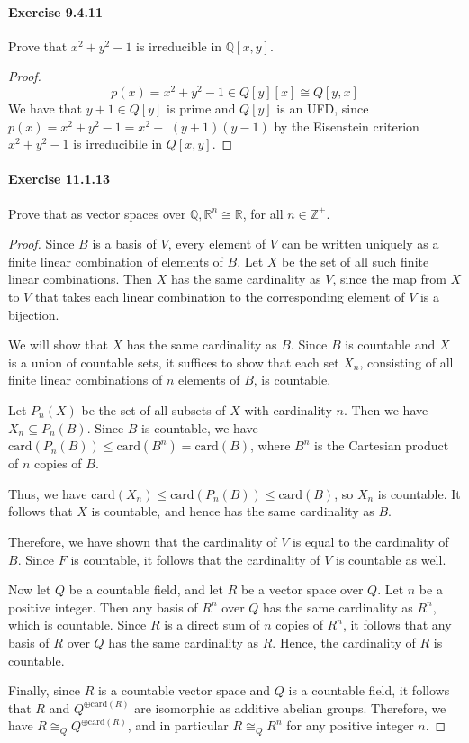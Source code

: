 \documentclass{article}
\theoremstyle{definition}
\begin{document}
\paragraph{Exercise 9.4.11} Prove that $x^2+y^2-1$ is irreducible in $\mathbb{Q}[x,y]$.
\begin{proof}
$$
p(x)=x^2+y^2-1 \in Q[y][x] \cong Q[y, x]
$$
We have that $y+1 \in Q[y]$ is prime and $Q[y]$ is an UFD, since $p(x)=x^2+y^2-1=x^2+$ $(y+1)(y-1)$ by the Eisenstein criterion $x^2+y^2-1$ is irreducibile in $Q[x, y]$.
\end{proof}



\paragraph{Exercise 11.1.13} Prove that as vector spaces over $\mathbb{Q}, \mathbb{R}^n \cong \mathbb{R}$, for all $n \in \mathbb{Z}^{+}$.
\begin{proof}    
Since $B$ is a basis of $V$, every element of $V$ can be written uniquely as a finite linear combination of elements of $B$. Let $X$ be the set of all such finite linear combinations. Then $X$ has the same cardinality as $V$, since the map from $X$ to $V$ that takes each linear combination to the corresponding element of $V$ is a bijection.

We will show that $X$ has the same cardinality as $B$. Since $B$ is countable and $X$ is a union of countable sets, it suffices to show that each set $X_n$, consisting of all finite linear combinations of $n$ elements of $B$, is countable.

Let $P_n(X)$ be the set of all subsets of $X$ with cardinality $n$. Then we have $X_n \subseteq P_n(B)$. Since $B$ is countable, we have $\mathrm{card}(P_n(B)) \leq \mathrm{card}(B^n) = \mathrm{card}(B)$, where $B^n$ is the Cartesian product of $n$ copies of $B$.

Thus, we have $\mathrm{card}(X_n) \leq \mathrm{card}(P_n(B)) \leq \mathrm{card}(B)$, so $X_n$ is countable. It follows that $X$ is countable, and hence has the same cardinality as $B$.

Therefore, we have shown that the cardinality of $V$ is equal to the cardinality of $B$. Since $F$ is countable, it follows that the cardinality of $V$ is countable as well.

Now let $Q$ be a countable field, and let $R$ be a vector space over $Q$. Let $n$ be a positive integer. Then any basis of $R^n$ over $Q$ has the same cardinality as $R^n$, which is countable. Since $R$ is a direct sum of $n$ copies of $R^n$, it follows that any basis of $R$ over $Q$ has the same cardinality as $R$. Hence, the cardinality of $R$ is countable.

Finally, since $R$ is a countable vector space and $Q$ is a countable field, it follows that $R$ and $Q^{\oplus \mathrm{card}(R)}$ are isomorphic as additive abelian groups. Therefore, we have $R \cong_Q Q^{\oplus \mathrm{card}(R)}$, and in particular $R \cong_Q R^n$ for any positive integer $n$.
\end{proof}
\end{document}
